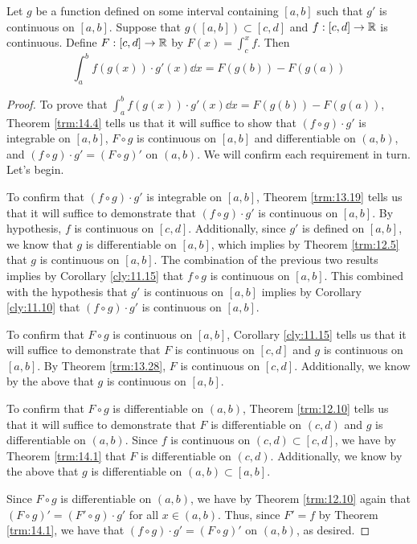 \documentclass[../main.tex]{subfiles}
\begin{document}
\begin{corollary}\label{cly:14.6}
    Let $g$ be a function defined on some interval containing $[a,b]$ such that $g'$ is continuous on $[a,b]$. Suppose that $g([a,b])\subset[c,d]$ and $f:[c,d]\to\mathbb{R}$ is continuous. Define $F:[c,d]\to\mathbb{R}$ by $F(x)=\int_c^xf$. Then
    \begin{equation*}
        \int_a^bf(g(x))\cdot g'(x)\dd{x} = F(g(b))-F(g(a))
    \end{equation*}
    \begin{proof}
        To prove that $\int_a^bf(g(x))\cdot g'(x)\dd{x}=F(g(b))-F(g(a))$, Theorem \ref{trm:14.4} tells us that it will suffice to show that $(f\circ g)\cdot g'$ is integrable on $[a,b]$, $F\circ g$ is continuous on $[a,b]$ and differentiable on $(a,b)$, and $(f\circ g)\cdot g'=(F\circ g)'$ on $(a,b)$. We will confirm each requirement in turn. Let's begin.\par
        To confirm that $(f\circ g)\cdot g'$ is integrable on $[a,b]$, Theorem \ref{trm:13.19} tells us that it will suffice to demonstrate that $(f\circ g)\cdot g'$ is continuous on $[a,b]$. By hypothesis, $f$ is continuous on $[c,d]$. Additionally, since $g'$ is defined on $[a,b]$, we know that $g$ is differentiable on $[a,b]$, which implies by Theorem \ref{trm:12.5} that $g$ is continuous on $[a,b]$. The combination of the previous two results implies by Corollary \ref{cly:11.15} that $f\circ g$ is continuous on $[a,b]$. This combined with the hypothesis that $g'$ is continuous on $[a,b]$ implies by Corollary \ref{cly:11.10} that $(f\circ g)\cdot g'$ is continuous on $[a,b]$.\par
        To confirm that $F\circ g$ is continuous on $[a,b]$, Corollary \ref{cly:11.15} tells us that it will suffice to demonstrate that $F$ is continuous on $[c,d]$ and $g$ is continuous on $[a,b]$. By Theorem \ref{trm:13.28}, $F$ is continuous on $[c,d]$. Additionally, we know by the above that $g$ is continuous on $[a,b]$.\par
        To confirm that $F\circ g$ is differentiable on $(a,b)$, Theorem \ref{trm:12.10} tells us that it will suffice to demonstrate that $F$ is differentiable on $(c,d)$ and $g$ is differentiable on $(a,b)$. Since $f$ is continuous on $(c,d)\subset[c,d]$, we have by Theorem \ref{trm:14.1} that $F$ is differentiable on $(c,d)$. Additionally, we know by the above that $g$ is differentiable on $(a,b)\subset[a,b]$.\par
        Since $F\circ g$ is differentiable on $(a,b)$, we have by Theorem \ref{trm:12.10} again that $(F\circ g)'=(F'\circ g)\cdot g'$ for all $x\in(a,b)$. Thus, since $F'=f$ by Theorem \ref{trm:14.1}, we have that $(f\circ g)\cdot g'=(F\circ g)'$ on $(a,b)$, as desired.
    \end{proof}
\end{corollary}
\end{document}

